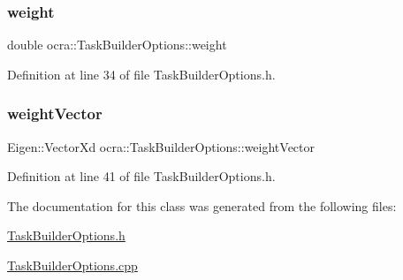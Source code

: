\subsubsection{\texorpdfstring{weight}{weight}}
{\footnotesize\ttfamily double ocra\+::\+Task\+Builder\+Options\+::weight}



Definition at line 34 of file Task\+Builder\+Options.\+h.

\hypertarget{classocra_1_1TaskBuilderOptions_ae86b78dda6e73227f5aeb0447f60158a}{}\label{classocra_1_1TaskBuilderOptions_ae86b78dda6e73227f5aeb0447f60158a} 
\subsubsection{\texorpdfstring{weight\+Vector}{weightVector}}
{\footnotesize\ttfamily Eigen\+::\+Vector\+Xd ocra\+::\+Task\+Builder\+Options\+::weight\+Vector}



Definition at line 41 of file Task\+Builder\+Options.\+h.



The documentation for this class was generated from the following files\+:\begin{DoxyCompactItemize}
\item 
\hyperlink{TaskBuilderOptions_8h}{Task\+Builder\+Options.\+h}\item 
\hyperlink{TaskBuilderOptions_8cpp}{Task\+Builder\+Options.\+cpp}\end{DoxyCompactItemize}
